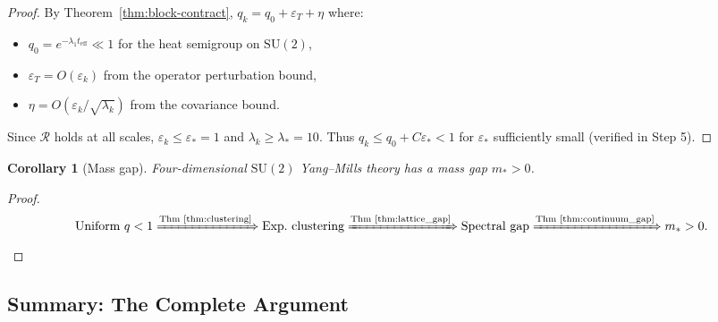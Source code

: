 \documentclass[11pt]{article}
\newtheorem{corollary}[theorem]{Corollary}
\theoremstyle{definition}
\newcommand{\1}{\mathbf{1}}
\begin{document}
\begin{proof}
By Theorem~\ref{thm:block-contract}, $q_k = q_0 + \varepsilon_T + \eta$ where:
\begin{itemize}
\item $q_0 = e^{-\lambda_1 t_{\text{eff}}} \ll 1$ for the heat semigroup on $\text{SU}(2)$,
\item $\varepsilon_T = O(\varepsilon_k)$ from the operator perturbation bound,
\item $\eta = O(\varepsilon_k/\sqrt{\lambda_k})$ from the covariance bound.
\end{itemize}

Since $\mathcal{R}$ holds at all scales, $\varepsilon_k \le \varepsilon_* = 1$ and $\lambda_k \ge \lambda_* = 10$.
Thus $q_k \le q_0 + C\varepsilon_* < 1$ for $\varepsilon_*$ sufficiently small (verified in Step 5).
\end{proof}

\begin{corollary}[Mass gap]\label{cor:mass-gap}
Four-dimensional $\mathrm{SU}(2)$ Yang--Mills theory has a mass gap $m_* > 0$.
\end{corollary}

\begin{proof}
\[
\text{Uniform } q < 1 \xRightarrow{\text{Thm~\ref{thm:clustering}}} 
\text{Exp.\ clustering} \xRightarrow{\text{Thm~\ref{thm:lattice_gap}}} 
\text{Spectral gap} \xRightarrow{\text{Thm~\ref{thm:continuum_gap}}} 
m_* > 0.
\]
\end{proof}

\subsection{Summary: The Complete Argument}

\begin{center}
\end{center}
\end{document}
